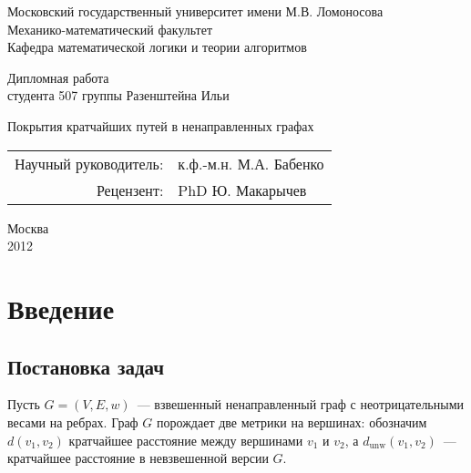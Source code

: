 \documentclass[12pt]{article}
\newcommand{\dunw}{d_{\mathrm{unw}}}
\begin{document}
    \thispagestyle{empty}
    \begin{center}
        Московский государственный университет имени
        М.В. Ломоносова\\
        Механико-математический факультет\\
        Кафедра математической логики и теории алгоритмов
    \end{center}
    \vspace{2cm}
    \begin{center}
        {\Large Дипломная работа}\\
        студента 507 группы
        Разенштейна Ильи
    \end{center}
    \vspace{1cm}
    \begin{center}
        {\Large Покрытия кратчайших путей в ненаправленных графах}
    \end{center}
    \vspace{3cm}
    \begin{flushright}
        \begin{tabular}{rl}
            Научный руководитель: & к.ф.-м.н. М.А. Бабенко\\
            Рецензент: & PhD Ю. Макарычев
        \end{tabular}
    \end{flushright}
    \vspace{\fill}
    \begin{center}
        Москва\\2012
    \end{center}
    \pagebreak
    \tableofcontents
    \section{Введение}
    \subsection{Постановка задач}
    Пусть $G = (V, E, w)$~--- взвешенный ненаправленный граф с неотрицательными весами на ребрах.
    Граф $G$ порождает две метрики на вершинах: обозначим $d(v_1, v_2)$ кратчайшее расстояние между вершинами $v_1$
    и $v_2$, а $\dunw(v_1, v_2)$~--- кратчайшее расстояние в невзвешенной версии $G$.
\end{document}
